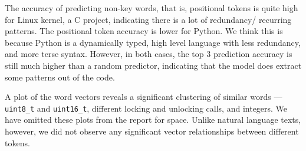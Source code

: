 The accuracy of predicting non-key words, that is, positional tokens is quite
high for Linux kernel, a C project, indicating there is a lot of redundancy/
recurring patterns. The positional token accuracy is lower for Python.
We think this is because Python is a dynamically typed, high level
language with less redundancy, and more terse syntax.
However, in both cases, the top 3 prediction
accuracy is still much higher than a random predictor, indicating that the
model does extract some patterns out of the code.

A plot of the word vectors reveals a significant clustering of similar
words --- {\texttt {uint8\_t}} and {\texttt {uint16\_t}}, different locking and
unlocking calls, and integers. We have omitted these plots from the report for
space. Unlike natural language texts, however,
we did not observe any significant vector relationships between different
tokens.
